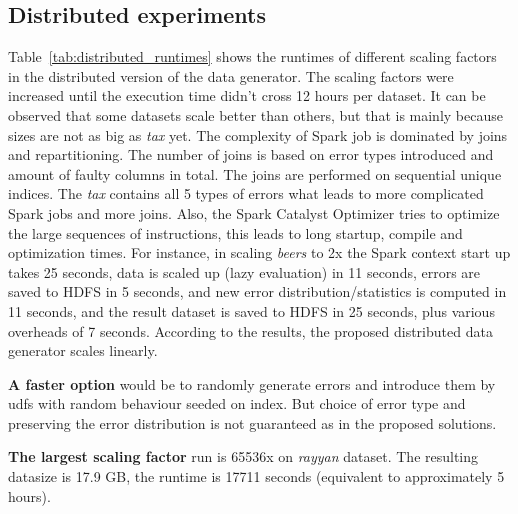 \subsection{Distributed experiments}
\label{sec:runtime_distributed}

Table~\ref{tab:distributed_runtimes} shows the runtimes of different scaling factors in the distributed version of the data generator.
The scaling factors were increased until the execution time didn't cross 12 hours per dataset.
It can be observed that some datasets scale better than others, but that is mainly because sizes are not as big as \textit{tax} yet. 
The complexity of Spark job is dominated by joins and repartitioning.
The number of joins is based on error types introduced and amount of faulty columns in total.
The joins are performed on sequential unique indices.
The \textit{tax} contains all 5 types of errors what leads to more complicated Spark jobs and more joins.
Also, the Spark Catalyst Optimizer tries to optimize the large sequences of instructions, this leads to long startup, compile and optimization times. 
For instance, in scaling \textit{beers} to 2x the Spark context start up takes 25 seconds, data is scaled up (lazy evaluation) in 11 seconds, errors are saved to HDFS in 5 seconds, and new error distribution/statistics is computed in 11 seconds, and the result dataset is saved to HDFS in 25 seconds, plus various overheads of 7 seconds.
According to the results, the proposed distributed data generator scales linearly.

\textbf{A faster option} would be to randomly generate errors and introduce them by udfs with random behaviour seeded on index.
But choice of error type and preserving the error distribution is not guaranteed as in the proposed solutions.

\textbf{The largest scaling factor} run is 65536x on \textit{rayyan} dataset. 
The resulting datasize is 17.9 GB, the runtime is 17711 seconds (equivalent to approximately 5 hours).


